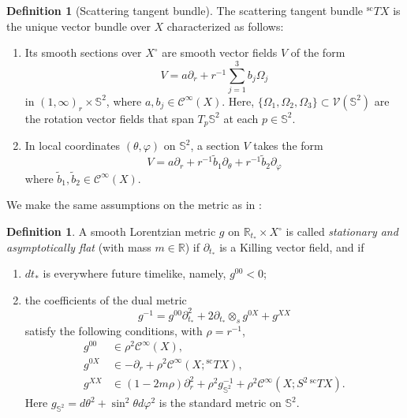 \documentclass[10pt,a4paper,reqno]{amsart}
\newcommand{\CI}{\mathcal{C}^\infty}
\newcommand{\RR}{\mathbb{R}}
\newcommand{\pa}{\partial}
\newcommand{\inv}{^{-1}}
\newcommand{\iy}{\infty}
\renewcommand{\S}{{\mathbb S}}
\theoremstyle{definition}
\newtheorem{definition}[theorem]{Definition}
\theoremstyle{remark}
\numberwithin{equation}{section}
\newcommand{\R}{\mathbb R}
\newcommand{\calC}{\mathcal C}
\newcommand{\ts}{t_*}
\begin{document}
\begin{definition}[Scattering tangent bundle]\label{scattering tangent bundle}
The scattering tangent bundle ${}^\textrm{sc} T X$ is the unique vector bundle over $X$ characterized as follows:

\begin{enumerate}
    \item Its smooth sections over $X^\circ$ are smooth vector fields $V$ of the form
   \[ V = a\partial_r + r^{-1}\sum_{j=1}^3 b_j \Omega_j \]
   in $(1,\infty)_r\times\mathbb{S}^2$, where $a, b_j\in\CI(X)$.
Here, $\{\Omega_1, \Omega_2, \Omega_3\} \subset \mathcal{V}(\mathbb{S}^2)$ are the rotation vector fields that span $T_p \mathbb{S}^2$ at each $p\in\mathbb{S}^2$.

\item In local coordinates $(\theta,\varphi)$ on $\mathbb{S}^2$, a section $V$ takes the form
   \[ V = a\partial_r + r^{-1} \tilde{b}_1 \partial_\theta + r^{-1} \tilde{b}_2 \partial_\varphi \]
   where $\tilde{b}_1, \tilde{b}_2 \in \CI(X)$.
\end{enumerate}
\end{definition}


We make the same assumptions on the metric as in \cite{Hin22}:
\begin{definition}\label{def:metric}
A smooth Lorentzian metric $g$ on $\R_{\ts} \times X^\circ$ is called \textit{stationary and asymptotically flat} (with mass $m\in\RR$) if $\pa_{\ts}$ is a Killing vector field, and if
    \begin{enumerate}
    \item
    $d\ts$ is everywhere future timelike, namely, $g^{00}<0$;
    \item
    the coefficients of the dual metric
    $$g\inv = g^{00} \pa_{\ts}^2 + 2\pa_{\ts} \otimes_s g^{0X} + g^{XX}$$
    satisfy the following conditions, with $\rho=r^{-1}$,
    \begin{align*}
    g^{00} &\in \rho^2 \calC^\iy(X),\\
    g^{0X} &\in -\pa_r + \rho^2 \calC^\iy(X; {}^\textrm{sc}TX),\\
    g^{XX} &\in (1-2m\rho)\pa_r^2 + \rho^2 g_{\S^2}\inv + \rho^2 \calC^\iy(X;S^2\, {}^\textrm{sc} T X).
    \end{align*}
    Here $g_{\S^2} = d\theta^2 + \sin^2\theta d\varphi^2$ is the standard metric on $\S^2$.
    \end{enumerate}
\end{definition}
\end{document}
